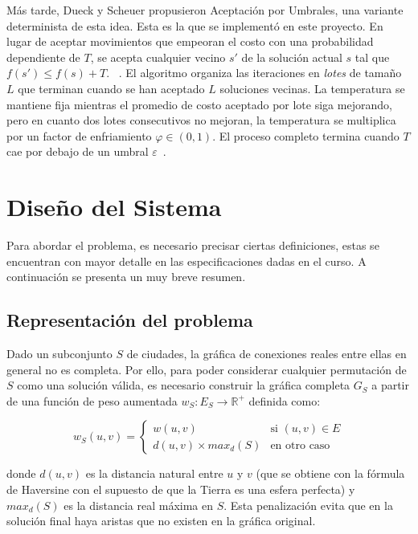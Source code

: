 \documentclass[9pt,a4paper,twocolumn,twoside]{rho-class/rho}
\begin{document}
Más tarde, Dueck y Scheuer propusieron Aceptación por Umbrales, una variante determinista de
esta idea. Esta es la que se implementó en este proyecto. En lugar de
aceptar movimientos que empeoran el costo con una probabilidad dependiente de $T$, se
acepta cualquier vecino $s'$ de la solución actual $s$ tal que $f(s') \le f(s) + T$. ~\cite{cursoHeuristicas}.
El algoritmo organiza las iteraciones en \textit{lotes} de tamaño $L$ que terminan cuando se han
aceptado $L$ soluciones vecinas. La temperatura se mantiene fija mientras el promedio de costo
aceptado por lote siga mejorando, pero en cuanto dos lotes consecutivos no mejoran,
la temperatura se multiplica por un factor de enfriamiento $\varphi \in (0,1)$. El proceso
completo termina cuando $T$ cae por debajo de un umbral $\varepsilon$~\cite{DUECK1990161}. \\

\newpage

\section{Diseño del Sistema}
Para abordar el problema, es necesario precisar ciertas definiciones, estas se encuentran con
mayor detalle en las especificaciones dadas en el curso. A continuación se presenta un muy breve
resumen.

\subsection{Representación del problema}
Dado un subconjunto $S$ de ciudades, la gráfica de conexiones reales entre ellas en general
no es completa. Por ello, para poder considerar cualquier permutación de $S$ como una solución
válida, es necesario construir la gráfica completa $G_S$ a partir de una función de peso 
aumentada $w_S: E_S \longrightarrow \mathbb{R}^{+}$  definida como:

$$
    w_{S}(u,v) =
    \begin{cases} 
        w(u,v) & \text{si } (u,v)\in E \\ d(u,v) \times max_{d}(S) & \text{en otro caso} 
    \end{cases}
$$

donde $d(u,v)$ es la distancia natural entre $u$ y $v$ (que se obtiene con la fórmula de 
Haversine con el supuesto de que la Tierra es una esfera perfecta) y $max_d(S)$ es la distancia
real máxima en $S$. Esta penalización evita que en la solución final haya aristas que no existen
en la gráfica original. \\
\end{document}
